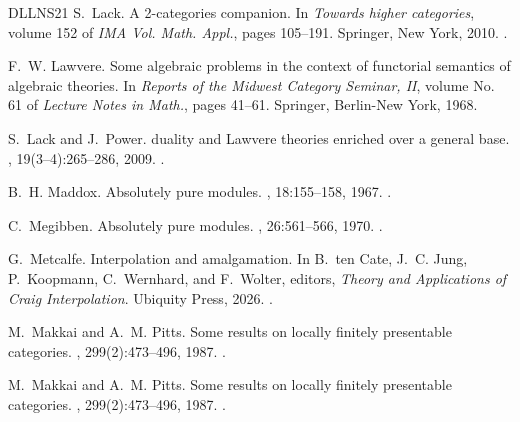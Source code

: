 \documentclass[a4paper,10pt,reqno]{amsart}
\theoremstyle{definition}
\theoremstyle{remark}
\begin{document}
\begin{thebibliography}{DLLNS21}
  S.~Lack.
  \newblock A 2-categories companion.
  \newblock In {\em Towards higher categories}, volume 152 of {\em IMA Vol. Math. Appl.}, pages 105--191. Springer, New York, 2010.
  \newblock \href {https://doi.org/10.1007/978-1-4419-1524-5\_4} {}.
  
  F.~W. Lawvere.
  \newblock Some algebraic problems in the context of functorial semantics of algebraic theories.
  \newblock In {\em Reports of the {M}idwest {C}ategory {S}eminar, {II}}, volume No. 61 of {\em Lecture Notes in Math.}, pages 41--61. Springer, Berlin-New York, 1968.
  
  S.~Lack and J.~Power.
   duality and {Lawvere} theories enriched over a general base.
  , 19(3--4):265--286, 2009.
  \newblock \href {https://doi.org/10.1017/S0956796809007254} {}.
  
  B.~H. Maddox.
  \newblock Absolutely pure modules.
  , 18:155--158, 1967.
  \newblock \href {https://doi.org/10.2307/2035245} {}.
  
  C.~Megibben.
  \newblock Absolutely pure modules.
  , 26:561--566, 1970.
  \newblock \href {https://doi.org/10.2307/2037108} {}.
  
  G.~Metcalfe.
  \newblock Interpolation and amalgamation.
  \newblock In B.~ten Cate, J.~C. Jung, P.~Koopmann, C.~Wernhard, and F.~Wolter, editors, {\em Theory and Applications of Craig Interpolation}. Ubiquity Press, 2026.
  \newblock \href {https://doi.org/10.5334/bdg} {}.
  
  M.~Makkai and A.~M. Pitts.
  \newblock Some results on locally finitely presentable categories.
  , 299(2):473--496, 1987.
  \newblock \href {https://doi.org/10.2307/2000508} {}.
  
  M.~Makkai and A.~M. Pitts.
  \newblock Some results on locally finitely presentable categories.
  , 299(2):473--496, 1987.
  \newblock \href {https://doi.org/10.1090/S0002-9947-1987-0869216-2} {}.
  

\end{thebibliography}
\end{document}
